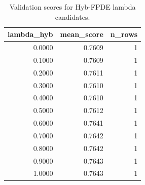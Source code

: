 \begin{table}[t]
\caption{Validation scores for Hyb-FPDE lambda candidates.}
\label{tab:lambda_distribution_computed}
\centering
\begin{tabular}{rrr}
\toprule
lambda\_hyb & mean\_score & n\_rows \\
\midrule
0.0000 & 0.7609 & 1 \\
0.1000 & 0.7609 & 1 \\
0.2000 & 0.7611 & 1 \\
0.3000 & 0.7610 & 1 \\
0.4000 & 0.7610 & 1 \\
0.5000 & 0.7612 & 1 \\
0.6000 & 0.7641 & 1 \\
0.7000 & 0.7642 & 1 \\
0.8000 & 0.7642 & 1 \\
0.9000 & 0.7643 & 1 \\
1.0000 & 0.7643 & 1 \\
\bottomrule
\end{tabular}

\end{table}
